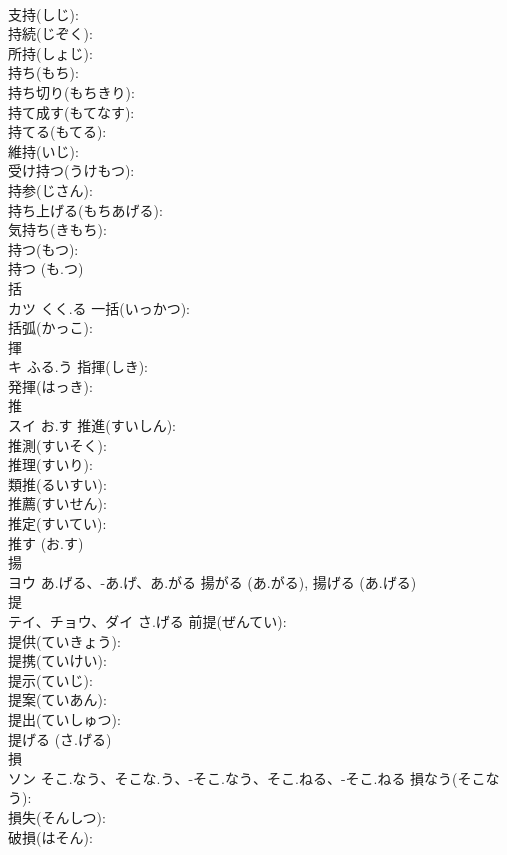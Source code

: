 \documentclass[8pt]{extreport}
\begin{document}
\begin{CJK}{UTF8}{min}
\\	支持(しじ): 
\\	持続(じぞく): 
\\	所持(しょじ): 
\\	持ち(もち): 
\\	持ち切り(もちきり): 
\\	持て成す(もてなす): 
\\	持てる(もてる): 
\\	維持(いじ): 
\\	受け持つ(うけもつ): 
\\	持参(じさん): 
\\	持ち上げる(もちあげる): 
\\	気持ち(きもち): 
\\	持つ(もつ): 
\\	持つ (も.つ)
\\	括			
\\	カツ	くく.る	一括(いっかつ): 
\\	括弧(かっこ): 
\\	揮			
\\	キ	ふる.う	指揮(しき): 
\\	発揮(はっき): 
\\	推			
\\	スイ	お.す	推進(すいしん): 
\\	推測(すいそく): 
\\	推理(すいり): 
\\	類推(るいすい): 
\\	推薦(すいせん): 
\\	推定(すいてい): 
\\	推す (お.す)
\\	揚			
\\	ヨウ	あ.げる、-あ.げ、あ.がる		揚がる (あ.がる), 揚げる (あ.げる)
\\	提			
\\	テイ、チョウ、ダイ	さ.げる	前提(ぜんてい): 
\\	提供(ていきょう): 
\\	提携(ていけい): 
\\	提示(ていじ): 
\\	提案(ていあん): 
\\	提出(ていしゅつ): 
\\	提げる (さ.げる)
\\	損			
\\	ソン	そこ.なう、そこな.う、-そこ.なう、そこ.ねる、-そこ.ねる	損なう(そこなう): 
\\	損失(そんしつ): 
\\	破損(はそん): 

\end{CJK}
\end{document}
